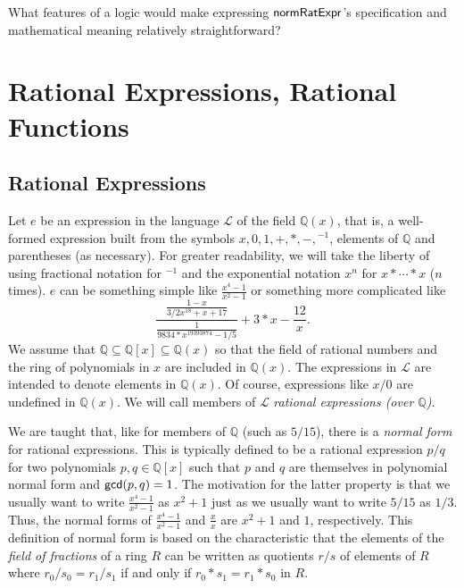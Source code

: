 \documentclass[fleqn]{llncs}
\newcommand{\QQ}{\ensuremath{\mathbb{Q}}}
\newcommand{\NRE}{\ensuremath{\mname{normRatExpr}}}
\newcommand{\Lang}{\ensuremath{\mathcal{L}}}
\begin{document}
  \item What features of a logic would make expressing {\NRE}'s
    specification and mathematical meaning relatively straightforward?

\ee
\fi




\section{Rational Expressions, Rational Functions}

\subsection{Rational Expressions}

Let $e$ be an expression in the language $\Lang$ of the field
$\QQ(x)$, that is, a well-formed expression built from the symbols $x,
0, 1, +, *, -, \phantom{}^{-1}$, elements of $\QQ$ and parentheses (as
necessary).  For greater readability, we will take the liberty of
using fractional notation for $\phantom{}^{-1}$ and the exponential
notation $x^n$ for $x * \cdots * x$ ($n$ times).  $e$ can be something
simple like $\frac{x^4-1}{x^2-1}$ or something more complicated like
\begin{equation*}
\frac{\frac{1-x}{3/2 x^{18} + x + 17}}
     {\frac{1}{9834*x^{19393874}-1/5}}+3*x -\frac{12}{x}.
\end{equation*}
We assume that $\QQ \subseteq \QQ[x] \subseteq \QQ(x)$ so that the
field of rational numbers and the ring of polynomials in $x$ are
included in $\QQ(x)$.  The expressions in $\Lang$ are intended to
denote elements in $\QQ(x)$.  Of course, expressions like $x/0$ are
undefined in $\QQ(x)$.  We will call members of $\Lang$ \emph{rational
  expressions (over $\QQ$)}.

We are taught that, like for members of $\QQ$ (such as $5/15$), there
is a \emph{normal form} for rational expressions. This is typically
defined to be a rational expression $p/q$ for two polynomials $p,q \in \QQ[x]$
such that $p$ and $q$ are themselves in polynomial normal form and
$\mbox{\sf gcd}(p,q) = 1$.  The motivation for the latter
property is that we usually want to write $\frac{x^4-1}{x^2-1}$ as
$x^2 + 1$ just as we usually want to write $5/15$ as $1/3$.  Thus, the
normal forms of $\frac{x^4-1}{x^2-1}$ and $\frac{x}{x}$ are $x^2 + 1$
and $1$, respectively.  This definition of normal form is based on the
characteristic that the elements of the \emph{field of fractions} of a
ring $R$ can be written as quotients $r/s$ of elements of $R$ where
$r_0/s_0 = r_1/s_1$ if and only if $r_0 * s_1 = r_1 * s_0$ in $R$.
\end{document}
